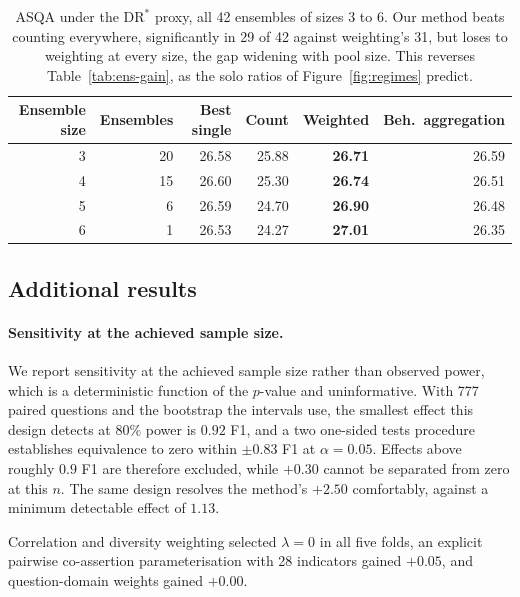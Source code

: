 \documentclass{article}
\begin{document}
\begin{table}
  \caption{ASQA under the $\mathrm{DR}^*$ proxy, all 42 ensembles of sizes 3 to 6. Our method beats counting everywhere, significantly in 29 of 42 against weighting's 31, but loses to weighting at every size, the gap widening with pool size. This reverses Table~\ref{tab:ens-gain}, as the solo ratios of Figure~\ref{fig:regimes} predict.}
  \label{tab:asqa}
  \centering
  \begin{tabular}{rrrrrr}
    \toprule
    Ensemble size & Ensembles & Best single & Count & Weighted & Beh.\ aggregation \\
    \midrule
    3 & 20 & 26.58 & 25.88 & \textbf{26.71} & 26.59 \\
    4 & 15 & 26.60 & 25.30 & \textbf{26.74} & 26.51 \\
    5 &  6 & 26.59 & 24.70 & \textbf{26.90} & 26.48 \\
    6 &  1 & 26.53 & 24.27 & \textbf{27.01} & 26.35 \\
    \bottomrule
  \end{tabular}
\end{table}

\subsection{Additional results}
\label{app:extra}

\paragraph{Sensitivity at the achieved sample size.}
We report sensitivity at the achieved sample size rather than observed power, which is a
deterministic function of the $p$-value and uninformative. With 777 paired questions and the
bootstrap the intervals use, the smallest effect this design detects at $80\%$ power is $0.92$
F1, and a two one-sided tests procedure establishes equivalence to zero within $\pm 0.83$ F1 at
$\alpha = 0.05$. Effects above roughly $0.9$ F1 are therefore excluded, while $+0.30$ cannot be
separated from zero at this $n$. The same design resolves the method's $+2.50$ comfortably,
against a minimum detectable effect of $1.13$.

Correlation and diversity weighting selected $\lambda = 0$ in all five folds, an explicit pairwise co-assertion parameterisation with 28 indicators gained $+0.05$, and question-domain weights gained $+0.00$. %
\end{document}

